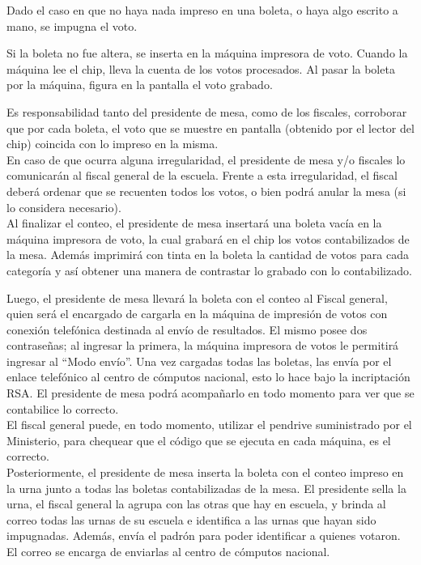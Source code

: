 Dado el caso en que no haya nada impreso en una boleta, o haya algo escrito a mano, se impugna el voto.

Si la boleta no fue altera, se inserta en la m\'aquina impresora de voto. Cuando la máquina lee el chip, lleva la cuenta de los votos procesados. Al pasar la boleta por la máquina, figura en la pantalla el voto grabado. 

Es responsabilidad tanto del presidente de mesa, como de los fiscales, corroborar que por cada boleta, el voto que se muestre en pantalla (obtenido por el lector del chip) coincida con lo impreso en la misma.\\

En caso de que ocurra alguna irregularidad, el presidente de mesa y/o fiscales lo comunicarán al fiscal general de la escuela. Frente a esta irregularidad, el fiscal deber\'a ordenar que se recuenten todos los votos, o bien podrá anular la mesa (si lo considera necesario).\\

Al finalizar el conteo, el presidente de mesa insertará una boleta vacía en la máquina impresora de voto, la cual grabará en el chip los votos contabilizados de la mesa. Además imprimirá con tinta en la boleta la cantidad de votos para cada categoría y así obtener una manera de contrastar lo grabado con lo contabilizado.

Luego, el presidente de mesa llevará la boleta con el conteo al Fiscal general, quien será el encargado de cargarla en la máquina de impresión de votos con conexión telefónica destinada al envío de resultados. El mismo posee dos contraseñas; al ingresar la primera, la máquina impresora de votos le permitirá ingresar al “Modo envío”. Una vez cargadas todas las boletas, las envía por el enlace telefónico al centro de cómputos nacional, esto lo hace bajo la incriptaci\'on RSA. El presidente de mesa podrá acompañarlo en todo momento para ver que se contabilice lo correcto.\\

El fiscal general puede, en todo momento, utilizar el pendrive suministrado por el Ministerio, para chequear que el código que se ejecuta en cada máquina, es el correcto.\\

Posteriormente, el presidente de mesa inserta la boleta con el conteo impreso en la urna junto a todas las boletas contabilizadas de la mesa. El presidente sella la urna, el fiscal general la agrupa con las otras que hay en escuela, y brinda al correo todas las urnas de su escuela e identifica a las urnas que hayan sido impugnadas. Además, envía el padrón para poder identificar a quienes votaron. El correo se encarga de enviarlas al centro de cómputos nacional.\\


